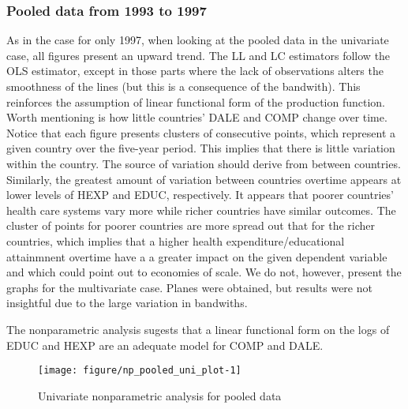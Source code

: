 \documentclass[12pt,a4paper]{article}\usepackage[]{graphicx}\usepackage[]{color}
\newenvironment{knitrout}{}{} %
\begin{document}
\subsubsection{Pooled data from 1993 to 1997}

As in the case for only 1997, when looking at the pooled data in the univariate case, all figures present an upward trend. The LL and LC estimators follow the OLS estimator, except in those parts where the lack of observations alters the smoothness of the lines (but this is a consequence of the bandwith). This reinforces the assumption of linear functional form of the production function. Worth mentioning is how little countries' DALE and COMP change over time. Notice that each figure presents clusters of consecutive points, which represent a given country over the five-year period. This implies that there is little variation within the country. The source of variation should derive from between countries. Similarly, the greatest amount of variation between countries overtime appears at lower levels of HEXP and EDUC, respectively. It appears that poorer countries' health care systems vary more while richer countries have similar outcomes. The cluster of points for poorer countries are more spread out that for the richer countries, which implies that a higher health expenditure/educational attainmnent overtime have a a greater impact on the given dependent variable and which could point out to economies of scale. We do not, however, present the graphs for the multivariate case. Planes were obtained, but results were not insightful due to the large variation in bandwiths.

The nonparametric analysis sugests that a linear functional form on the logs of EDUC and HEXP are an adequate model for COMP and DALE.


\begin{knitrout}
\color{fgcolor}\begin{figure}[htbp]

{\centering \texttt{[image: figure/np\_pooled\_uni\_plot-1]} 

}

\caption[Univariate nonparametric analysis for pooled data]{Univariate nonparametric analysis for pooled data}\label{fig:np.pooled.uni.plot}
\end{figure}


\end{knitrout}
\end{document}
